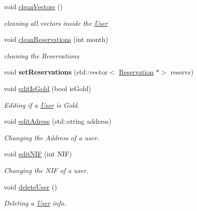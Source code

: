 \begin{DoxyCompactItemize}
\mbox{\label{class_user_a3ccbaec58dd37260a34dfa84496b30bd}} 
void \mbox{\hyperlink{class_user_a3ccbaec58dd37260a34dfa84496b30bd}{clean\+Vectors}} ()
\begin{DoxyCompactList}\small\item\em cleaning all vectors inside the \mbox{\hyperlink{class_user}{User}} \end{DoxyCompactList}\item 
\mbox{\label{class_user_a384f5eadff91f30d760d7e762628ba75}} 
void \mbox{\hyperlink{class_user_a384f5eadff91f30d760d7e762628ba75}{clean\+Reservations}} (int month)
\begin{DoxyCompactList}\small\item\em cleaning the Reservations \end{DoxyCompactList}\item 
\mbox{\label{class_user_a69d12edf2fb136601b7b9558f1c7b1e2}} 
void {\bfseries set\+Reservations} (std\+::vector$<$ \mbox{\hyperlink{class_reservation}{Reservation}} $\ast$$>$ reservs)
\item 
void \mbox{\hyperlink{class_user_a092c80f086767a8c204320b6517bfc58}{edit\+Is\+Gold}} (bool is\+Gold)
\begin{DoxyCompactList}\small\item\em Editing if a \mbox{\hyperlink{class_user}{User}} is Gold. \end{DoxyCompactList}\item 
void \mbox{\hyperlink{class_user_a9d826d552e81ecc17828be848e02519b}{edit\+Adress}} (std\+::string address)
\begin{DoxyCompactList}\small\item\em Changing the Address of a user. \end{DoxyCompactList}\item 
void \mbox{\hyperlink{class_user_a470738d77c8d53ab5c41cdcd74497a82}{edit\+N\+IF}} (int N\+IF)
\begin{DoxyCompactList}\small\item\em Changing the N\+IF of a user. \end{DoxyCompactList}\item 
\mbox{\label{class_user_ab29f666469897568a6c592869cc0a4f9}} 
void \mbox{\hyperlink{class_user_ab29f666469897568a6c592869cc0a4f9}{delete\+User}} ()
\begin{DoxyCompactList}\small\item\em Deleting a \mbox{\hyperlink{class_user}{User}} info. \end{DoxyCompactList}\item 
$$
\end{DoxyCompactItemize}
